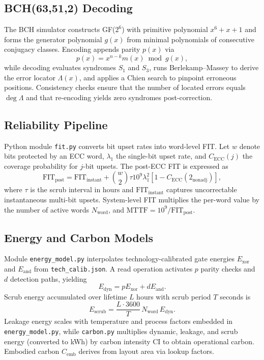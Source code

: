 \documentclass[conference]{IEEEtran}
\begin{document}
\subsection{BCH(63,51,2) Decoding}
The BCH simulator constructs GF($2^{6}$) with primitive polynomial $x^{6}+x+1$ and forms the generator polynomial $g(x)$ from minimal polynomials of consecutive conjugacy classes.
Encoding appends parity $p(x)$ via
\begin{equation}
    p(x) = x^{n-k} m(x) \bmod g(x),
\end{equation}
while decoding evaluates syndromes $S_{1}$ and $S_{3}$, runs Berlekamp--Massey to derive the error locator $\Lambda(x)$, and applies a Chien search to pinpoint erroneous positions.
Consistency checks ensure that the number of located errors equals $\deg \Lambda$ and that re-encoding yields zero syndromes post-correction.
\subsection{Reliability Pipeline}
Python module \texttt{fit.py} converts bit upset rates into word-level FIT.
Let $w$ denote bits protected by an ECC word, $\lambda_{1}$ the single-bit upset rate, and $C_{\text{ECC}}(j)$ the coverage probability for $j$-bit upsets.
The post-ECC FIT is expressed as
\begin{equation}
    \text{FIT}_{\text{post}} = \text{FIT}_{\text{instant}} + \binom{w}{2} \tau 10^{9} \lambda_{1}^{2}\left[1-C_{\text{ECC}}(2_{\text{nonadj}})\right],
\end{equation}
where $\tau$ is the scrub interval in hours and $\text{FIT}_{\text{instant}}$ captures uncorrectable instantaneous multi-bit upsets.
System-level FIT multiplies the per-word value by the number of active words $N_{\text{word}}$, and $\text{MTTF} = 10^{9}/\text{FIT}_{\text{post}}$.
\subsection{Energy and Carbon Models}
Module \texttt{energy\_model.py} interpolates technology-calibrated gate energies $E_{\text{xor}}$ and $E_{\text{and}}$ from \texttt{tech\_calib.json}.
A read operation activates $p$ parity checks and $d$ detection paths, yielding
\begin{equation}
    E_{\text{dyn}} = pE_{\text{xor}} + dE_{\text{and}}.
\end{equation}
Scrub energy accumulated over lifetime $L$ hours with scrub period $T$ seconds is
\begin{equation}
    E_{\text{scrub}} = \frac{L\cdot3600}{T}\,N_{\text{word}}\,E_{\text{dyn}}.
\end{equation}
Leakage energy scales with temperature and process factors embedded in \texttt{energy\_model.py}, while \texttt{carbon.py} multiplies dynamic, leakage, and scrub energy (converted to kWh) by carbon intensity $\text{CI}$ to obtain operational carbon.
Embodied carbon $C_{\text{emb}}$ derives from layout area via lookup factors.
\end{document}
